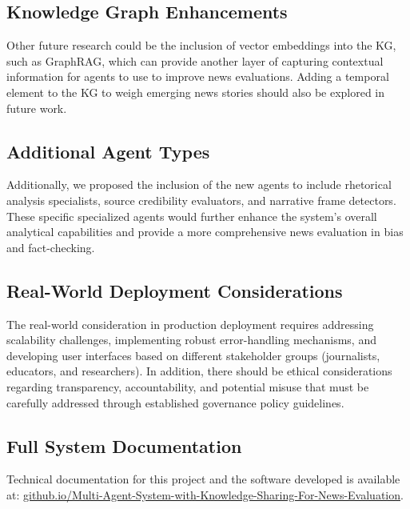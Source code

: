 \documentclass[11pt]{article}
\begin{document}
\subsection{Knowledge Graph Enhancements}
Other future research could be the inclusion of vector embeddings into the KG, such as GraphRAG, which can provide another layer of capturing contextual information for agents to use to improve news evaluations. Adding a temporal element to the KG to weigh emerging news stories should also be explored in future work.



\subsection{Additional Agent Types}
Additionally, we proposed the inclusion of the new agents to include rhetorical analysis specialists, source credibility evaluators, and narrative frame detectors. These specific specialized agents would further enhance the system’s overall analytical capabilities and provide a more comprehensive news evaluation in bias and fact-checking.

\subsection{Real-World Deployment Considerations}
The real-world consideration in production deployment requires addressing scalability challenges, implementing robust error-handling mechanisms, and developing user interfaces based on different stakeholder groups (journalists, educators, and researchers). In addition, there should be ethical considerations regarding transparency, accountability, and potential misuse that must be carefully addressed through established governance policy guidelines.



\subsection{Full System Documentation}
Technical documentation for this project and the software developed is available at:  
\href{https://modupeolawuraola.github.io/Multi-Agent-System-with-Knowledge-Sharing-For-News-Evaluation/architecture.html}{github.io/Multi-Agent-System-with-Knowledge-Sharing-For-News-Evaluation}.



\end{document}
